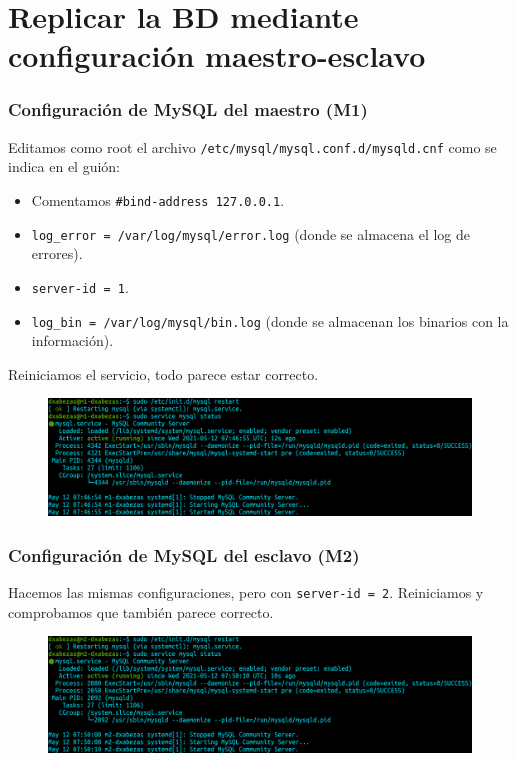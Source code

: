 \documentclass{article}
\begin{document}
\section{Replicar la BD mediante configuración maestro-esclavo}

\subsubsection*{Configuración de MySQL del maestro (M1)}

Editamos como root el archivo \texttt{/etc/mysql/mysql.conf.d/mysqld.cnf} como se indica en el guión:
\begin{itemize}
	\item Comentamos \texttt{\#bind-address 127.0.0.1}.
	\item \texttt{log\_error = /var/log/mysql/error.log} (donde se almacena el log de errores).
	\item \texttt{server-id = 1}.
	\item \texttt{log\_bin = /var/log/mysql/bin.log} (donde se almacenan los binarios con la información).
\end{itemize}

Reiniciamos el servicio, todo parece estar correcto.
\begin{figure}[H]
	\centering
	\includegraphics[width=170mm]{imgs/m1-mysql-restart}
\end{figure}

\subsubsection*{Configuración de MySQL del esclavo (M2)}
Hacemos las mismas configuraciones, pero con \texttt{server-id = 2}. Reiniciamos y comprobamos que también parece correcto.
\begin{figure}[H]
	\centering
	\includegraphics[width=170mm]{imgs/m2-mysql-restart}
\end{figure}
\end{document}
